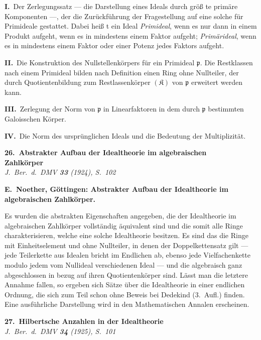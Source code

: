 \documentclass[12pt,a4paper]{article}
\begin{document}
{{\textbf{I.}\ Der Zerlegungssatz --- die Darstellung eines Ideals durch gr\"{o}{\ss} te
prim\"{a}re Komponenten ---, der die Zur\"{u}ckf\"{u}hrung der Fragestellung auf
eine solche f\"{u}r Primideale gestattet. Dabei hei{\ss} t ein Ideal \textit{Primideal},
wenn es nur dann in einem Produkt aufgeht, wenn es in mindestens
einem Faktor aufgeht; \textit{Prim\"{a}rideal}, wenn es in mindestens einem Faktor
oder einer Potenz jedes Faktors aufgeht.

\textbf{II.}\ Die Konstruktion des Nullstellenk\"{o}rpers f\"{u}r ein Primideal $\mathfrak{p}$.
Die Restklassen nach einem Primideal bilden nach Definition einen
Ring ohne Nullteiler, der durch Quotientenbildung zum Restlassenk\"{o}rper
$(\mathfrak{K})$ von $\mathfrak{p}$ erweitert werden kann.

\textbf{III.}\ Zerlegung der Norm von $\mathfrak{p}$ in Linearfaktoren in dem durch $\mathfrak{p}$
bestimmten Galoisschen K\"{o}rper.

\textbf{IV.}\ Die Norm des urspr\"{u}nglichen Ideals und die Bedeutung der
Multiplizit\"{a}t.

\newpage
\begin{center}
\Large\textbf{26.\ Abstrakter Aufbau der Idealtheorie im algebraischen\\Zahlk\"{o}rper}
\\[0.5em]
\normalsize\textit{J.\ Ber.\ d.\ DMV \textbf{33} (1924), S.~102}
\end{center}

\medskip
\noindent\textbf{E.~Noether, G\"{o}ttingen: Abstrakter Aufbau der Idealtheorie im algebraischen
Zahlk\"{o}rper.}

Es wurden die abstrakten Eigenschaften angegeben, die der Idealtheorie im
algebraischen Zahlk\"{o}rper vollst\"{a}ndig \"{a}quivalent sind und die somit alle Ringe
charakterisieren, welche eine solche Idealtheorie besitzen. Es sind das die Ringe
mit Einheitselement und ohne Nullteiler, in denen der Doppelkettensatz gilt ---
jede Teilerkette aus Idealen bricht im Endlichen ab, ebenso jede Vielfachenkette
modulo jedem vom Nullideal verschiedenen Ideal --- und die algebraisch ganz
abgeschlossen in bezug auf ihren Quotientenk\"{o}rper sind. L\"{a}sst man die letztere
Annahme fallen, so ergeben sich S\"{a}tze \"{u}ber die Idealtheorie in einer endlichen
Ordnung, die sich zum Teil schon ohne Beweis bei Dedekind (3.~Aufl.) finden.
Eine ausf\"{u}hrliche Darstellung wird in den Mathematischen Annalen erscheinen.

\newpage
\begin{center}
\Large\textbf{27.\ Hilbertsche Anzahlen in der Idealtheorie}
\\[0.5em]
\normalsize\textit{J.\ Ber.\ d.\ DMV \textbf{34} (1925), S.~101}
\end{center}

}}
\end{document}
